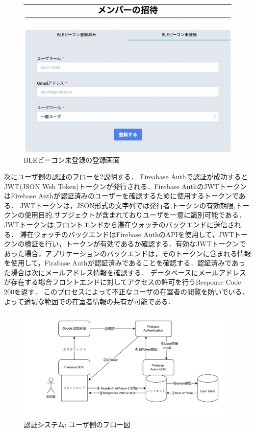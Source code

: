 \begin{figure}[tbh]
  \centering
  \includegraphics[width=16cm]{image/registerNotBLE.png}
  \caption{BLEビーコン未登録の登録画面} \label{fig:registerNotBLE}

\end{figure}


\newpage


次にユーザ側の認証のフローを\ref{fig:userLogin}説明する．
Fireabase Authで認証が成功するとJWT(JSON Web Token)トークンが発行される．Firebase AuthのJWTトークン はFirebase Authが認証済みのユーザーを確認するために使用するトークンである．
JWTトークンは，JSON形式の文字列では発行者,トークンの有効期限,トークンの使用目的,サブジェクトが含まれておりユーザを一意に識別可能である．
JWTトークンは,フロントエンドから滞在ウォッチのバックエンドに送信される．
滞在ウォッチのバックエンドはFirebase AuthのAPIを使用して，JWTトークンの検証を行い，トークンが有効であるか確認する．有効なJWTトークンであった場合，アプリケーションのバックエンドは，そのトークンに含まれる情報を使用して，Firabase Authが認証済みであることを確認する．認証済みであった場合は次にメールアドレス情報を確認する．
データベースにメールアドレスが存在する場合フロントエンドに対してアクセスの許可を行うResponse Code 200を返す．
このプロセスによって不正なユーザの在室者の閲覧を防いでいる．よって適切な範囲での在室者情報の共有が可能である．



\newpage

\begin{figure}[h]
  \centering  %
  \includegraphics[clip,scale = 0.8]{image/userLogin.pdf}
  \caption{認証システム: ユーザ側のフロー図}    \label{fig:userLogin}
\end{figure}


